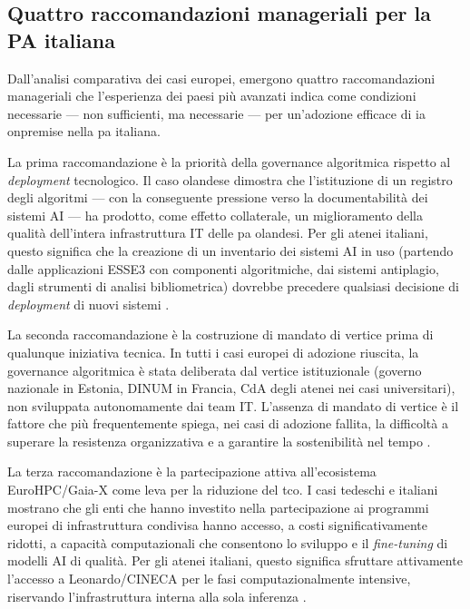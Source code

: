 \subsection{Quattro raccomandazioni manageriali per la PA italiana}

Dall'analisi comparativa dei casi europei, emergono quattro raccomandazioni
manageriali che l'esperienza dei paesi più avanzati indica come condizioni
necessarie --- non sufficienti, ma necessarie --- per un'adozione efficace di
\gls{ia} \gls{onpremise} nella \gls{pa} italiana.

La prima raccomandazione è la priorità della governance
algoritmica rispetto al \textit{deployment} tecnologico. Il caso olandese
dimostra che l'istituzione di un registro degli algoritmi --- con la conseguente
pressione verso la documentabilità dei sistemi AI --- ha prodotto, come effetto
collaterale, un miglioramento della qualità dell'intera infrastruttura IT delle
\gls{pa} olandesi. Per gli atenei italiani, questo significa che la creazione di un
inventario dei sistemi AI in uso (partendo dalle applicazioni ESSE3 con componenti
algoritmiche, dai sistemi antiplagio, dagli strumenti di analisi bibliometrica)
dovrebbe precedere qualsiasi decisione di \textit{deployment} di nuovi sistemi
\parencite{SvardGuerrero2024}.

La seconda raccomandazione è la costruzione di mandato di
vertice prima di qualunque iniziativa tecnica. In tutti i casi europei di
adozione riuscita, la governance algoritmica è stata deliberata dal vertice
istituzionale (governo nazionale in Estonia, DINUM in Francia, CdA degli
atenei nei casi universitari), non sviluppata autonomamente dai team IT.
L'assenza di mandato di vertice è il fattore che più frequentemente spiega,
nei casi di adozione fallita, la difficoltà a superare la resistenza
organizzativa e a garantire la sostenibilità nel tempo
\parencite{WeillRoss2004,LucianoWiedenhoft2020SAM}.

La terza raccomandazione è la partecipazione attiva
all'ecosistema EuroHPC/Gaia-X come leva per la riduzione del \gls{tco}. I casi
tedeschi e italiani mostrano che gli enti che hanno investito nella partecipazione
ai programmi europei di infrastruttura condivisa hanno accesso, a costi
significativamente ridotti, a capacità computazionali che consentono lo sviluppo
e il \textit{fine-tuning} di modelli AI di qualità. Per gli atenei italiani,
questo significa sfruttare attivamente l'accesso a Leonardo/CINECA per le fasi
computazionalmente intensive, riservando l'infrastruttura interna alla sola
inferenza \parencite{EuroHPC_Leonardo}.

